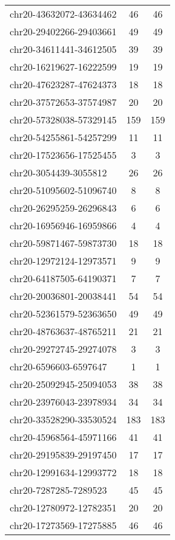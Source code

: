 \documentclass[10pt,letterpaper]{article}
\begin{document}
{\begin{longtable}{lSS}
	chr20-43632072-43634462 & 46     & 46       \\
	chr20-29402266-29403661 & 49     & 49       \\
	chr20-34611441-34612505 & 39     & 39       \\
	chr20-16219627-16222599 & 19     & 19       \\
	chr20-47623287-47624373 & 18     & 18       \\
	chr20-37572653-37574987 & 20     & 20       \\
	chr20-57328038-57329145 & 159    & 159      \\
	chr20-54255861-54257299 & 11     & 11       \\
	chr20-17523656-17525455 & 3      & 3        \\
	chr20-3054439-3055812   & 26     & 26       \\
	chr20-51095602-51096740 & 8      & 8        \\
	chr20-26295259-26296843 & 6      & 6        \\
	chr20-16956946-16959866 & 4      & 4        \\
	chr20-59871467-59873730 & 18     & 18       \\
	chr20-12972124-12973571 & 9      & 9        \\
	chr20-64187505-64190371 & 7      & 7        \\
	chr20-20036801-20038441 & 54     & 54       \\
	chr20-52361579-52363650 & 49     & 49       \\
	chr20-48763637-48765211 & 21     & 21       \\
	chr20-29272745-29274078 & 3      & 3        \\
	chr20-6596603-6597647   & 1      & 1        \\
	chr20-25092945-25094053 & 38     & 38       \\
	chr20-23976043-23978934 & 34     & 34       \\
	chr20-33528290-33530524 & 183    & 183      \\
	chr20-45968564-45971166 & 41     & 41       \\
	chr20-29195839-29197450 & 17     & 17       \\
	chr20-12991634-12993772 & 18     & 18       \\
	chr20-7287285-7289523   & 45     & 45       \\
	chr20-12780972-12782351 & 20     & 20       \\
	chr20-17273569-17275885 & 46     & 46       \\

\end{longtable}}
\end{document}
